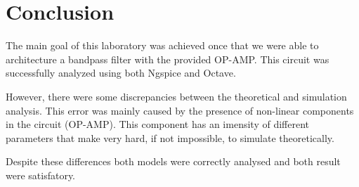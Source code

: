 \section{Conclusion}

The main goal of this laboratory was achieved once that we were able to architecture a bandpass filter with the provided OP-AMP. This circuit was successfully analyzed using both Ngspice and Octave. 
\par
However, there were some discrepancies between the theoretical and simulation analysis. This error was mainly caused by the presence of non-linear components in the circuit (OP-AMP). This component has an imensity of different parameters that make very hard, if not impossible, to simulate theoretically.
\par 
Despite these differences both models were correctly analysed and both result were satisfatory. 
